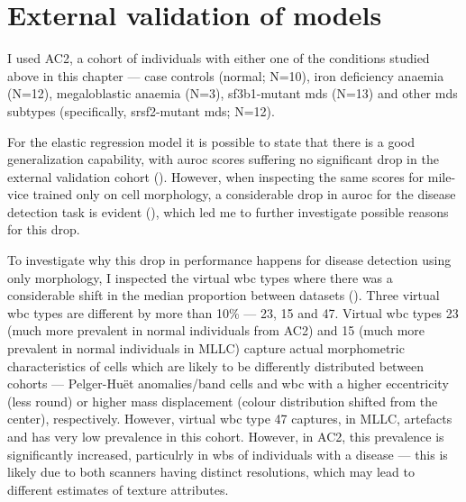\section{External validation of models}

I used AC2, a cohort of individuals with either one of the conditions studied above in this chapter --- case controls (normal; N=10), iron deficiency anaemia (N=12), megaloblastic anaemia (N=3), \ac{sf3b1}-mutant \ac{mds} (N=13) and other \ac{mds} subtypes (specifically, \ac{srsf2}-mutant \ac{mds}; N=12). 

For the elastic regression model it is possible to state that there is a good generalization capability, with \ac{auroc} scores suffering no significant drop in the external validation cohort (). However, when inspecting the same scores for \ac{mile-vice} trained only on cell morphology, a considerable drop in \ac{auroc} for the disease detection task is evident (), which led me to further investigate possible reasons for this drop.

\begin{figure}[!ht]
    \label{fig:glmnet-auc-validation}
\end{figure}

\begin{figure}[!ht]
    \label{fig:mile-vice-auc-validation}
\end{figure}

To investigate why this drop in performance happens for disease detection using only morphology, I inspected the virtual \ac{wbc} types where there was a considerable shift in the median proportion between datasets (). Three virtual \ac{wbc} types are different by more than 10\% --- 23, 15 and 47. Virtual \ac{wbc} types 23 (much more prevalent in normal individuals from AC2) and 15 (much more prevalent in normal individuals in MLLC) capture actual morphometric characteristics of cells which are likely to be differently distributed between cohorts --- Pelger-Huët anomalies/band cells and \ac{wbc} with a higher eccentricity (less round) or higher mass displacement (colour distribution shifted from the center), respectively. However, virtual \ac{wbc} type 47 captures, in MLLC, artefacts and has very low prevalence in this cohort. However, in AC2, this prevalence is significantly increased, particulrly in \ac{wbs} of individuals with a disease --- this is likely due to both scanners having distinct resolutions, which may lead to different estimates of texture attributes.

